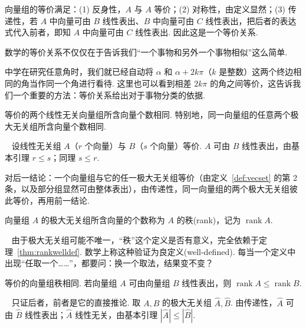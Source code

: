 \documentclass[lang=cn,10.5pt,scheme=chinese,toc=twocol,section,chinesefont=nofont,
twoside,citestyle=gb7714-2015,bibstyle=gb7714-2015]{elegantbook}
\DeclareRobustCommand{\textbf}[1]{{\lnsemiboldlatin\lnsemiboldcjk #1}}
\numberwithin{equation}{section}   %
\newcommand{\rk}{\operatorname{rank}}       %
\newcommand*{\lnlabel}[1]{{\sffamily\bfseries\color{black}#1}}
\renewenvironment{proof}{%
	\par\noindent\lnlabel{\proofname}\;\ \color{black!90}\cfs}{\par}
\renewenvironment{remark}{\noindent\lnlabel{\remarkname}\ }{\par}
\begin{document}
向量组的等价满足：(1) 反身性，$A$ 与 $A$ 等价；(2) 对称性，由定义显然；(3) 传递性，若 $A$ 中向量可由 $B$ 线性表出、$B$ 中向量可由 $C$ 线性表出，把后者的表达式代入前者，即知 $A$ 中向量可由 $C$ 线性表出. 因此这是一个\textbf{等价关系}.

\begin{motivebox}
  数学的等价关系不仅仅在于告诉我们“一个事物和另外一个事物相似”这么简单.

  中学在研究任意角时，我们就已经自动将 $\alpha$ 和 $\alpha + 2k\pi$（$k$ 是整数）这两个终边相同的角当作同一个角进行看待. 这里也可以看到相差 $2k\pi$ 的角之间等价，这告诉我们一个重要的方法：\textbf{等价关系给出对于事物分类的依据}.
\end{motivebox}

\begin{theorem}
  \label{thm:rankwelldef}
  等价的两个线性无关向量组所含向量个数相同. 特别地，同一向量组的任意两个极大无关组所含向量个数相同.
\end{theorem}
\begin{proof}
  设线性无关组 $A$（$r$ 个向量）与 $B$（$s$ 个向量）等价. $A$ 可由 $B$ 线性表出，由基本引理 $r\le s$；同理 $s\le r$.

  对后一结论：一个向量组与它的任一极大无关组等价（由定义~\ref{def:vecset} 的第 2 条，以及部分组显然可由整体表出），由传递性，同一向量组的两个极大无关组彼此等价，再用前一结论.
\end{proof}

\begin{definition}
  \label{def:rank}
  向量组 $A$ 的极大无关组所含向量的个数称为 $A$ 的\textbf{秩}(rank)，记为 $\rk A$.
\end{definition}

\begin{remark}
  由于极大无关组可能不唯一，“秩”这个定义是否有意义，完全依赖于定理~\ref{thm:rankwelldef}. 数学上称这种验证为\textbf{良定义}(well-defined). 每当一个定义中出现“任取一个……”，都要问：换一个取法，结果变不变？
\end{remark}

\begin{theorem}
  等价的向量组秩相同. 若向量组 $A$ 可由向量组 $B$ 线性表出，则 $\rk A\le\rk B$.
\end{theorem}
\begin{proof}
  只证后者，前者是它的直接推论. 取 $A,B$ 的极大无关组 $\hat A,\hat B$. 由传递性，$\hat A$ 可由 $\hat B$ 线性表出；$\hat A$ 线性无关，由基本引理 $|\hat A|\le|\hat B|$.
\end{proof}
\end{document}
